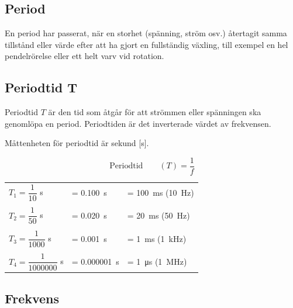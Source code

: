\subsection{Period}
\label{period}

En period har passerat, när en storhet (spänning, ström osv.) återtagit samma
tillstånd eller värde efter att ha gjort en fullständig växling, till exempel en
hel pendelrörelse eller ett helt varv vid rotation.

\subsection{Periodtid T}

Periodtid \(T\) är den tid som åtgår för att strömmen eller spänningen ska
genomlöpa en period. Periodtiden är det inverterade värdet av frekvensen.

Måttenheten för periodtid är sekund [s].

$$\text{Periodtid} \qquad (T) = \dfrac{1}{f}$$

\begin{exempelbox}
\begin{small}
\noindent
\begin{tabular}{@{}lll}
\(T_1=\dfrac{1}{10}\) s & = \qty{0,100}{\second} & = \qty{100}{\milli\second} (\qty{10}{\hertz})\\
\\
\(T_2=\dfrac{1}{50}\) s & = \qty{0,020}{\second} & = \qty{20}{\milli\second} (\qty{50}{\hertz})\\
\\
\(T_3=\dfrac{1}{1000}\) s & = \qty{0,001}{\second} & = \qty{1}{\milli\second} (\qty{1}{\kilo\hertz})\\
\\
\(T_4=\dfrac{1}{1000000}\) s & = \qty{0,000001}{\second} & = \qty{1}{\micro\second} (\qty{1}{\mega\hertz})\\
\end{tabular}
\end{small}
\end{exempelbox}

\subsection{Frekvens}
\label{frekvens}

